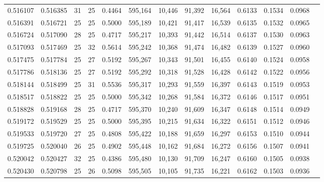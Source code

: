 \begin{tabular}{rrrrrrrrrrrrr}
0.516107 & 0.516385 &    31 &  25 &                                     0.4464 & 595,164 &  10,446 &  91,392 &  16,564 & 0.6133 & 0.1534 & 0.0968 \\
0.516391 & 0.516721 &    25 &  25 &                                     0.5000 & 595,189 &  10,421 &  91,417 &  16,539 & 0.6135 & 0.1532 & 0.0965 \\
0.516724 & 0.517090 &    28 &  25 &                                     0.4717 & 595,217 &  10,393 &  91,442 &  16,514 & 0.6137 & 0.1530 & 0.0963 \\
0.517093 & 0.517469 &    25 &  32 &                                     0.5614 & 595,242 &  10,368 &  91,474 &  16,482 & 0.6139 & 0.1527 & 0.0960 \\
0.517475 & 0.517784 &    25 &  27 &                                     0.5192 & 595,267 &  10,343 &  91,501 &  16,455 & 0.6140 & 0.1524 & 0.0958 \\
0.517786 & 0.518136 &    25 &  27 &                                     0.5192 & 595,292 &  10,318 &  91,528 &  16,428 & 0.6142 & 0.1522 & 0.0956 \\
0.518144 & 0.518499 &    25 &  31 &                                     0.5536 & 595,317 &  10,293 &  91,559 &  16,397 & 0.6143 & 0.1519 & 0.0953 \\
0.518517 & 0.518822 &    25 &  25 &                                     0.5000 & 595,342 &  10,268 &  91,584 &  16,372 & 0.6146 & 0.1517 & 0.0951 \\
0.518828 & 0.519168 &    28 &  25 &                                     0.4717 & 595,370 &  10,240 &  91,609 &  16,347 & 0.6148 & 0.1514 & 0.0949 \\
0.519172 & 0.519529 &    25 &  25 &                                     0.5000 & 595,395 &  10,215 &  91,634 &  16,322 & 0.6151 & 0.1512 & 0.0946 \\
0.519533 & 0.519720 &    27 &  25 &                                     0.4808 & 595,422 &  10,188 &  91,659 &  16,297 & 0.6153 & 0.1510 & 0.0944 \\
0.519725 & 0.520040 &    26 &  25 &                                     0.4902 & 595,448 &  10,162 &  91,684 &  16,272 & 0.6156 & 0.1507 & 0.0941 \\
0.520042 & 0.520427 &    32 &  25 &                                     0.4386 & 595,480 &  10,130 &  91,709 &  16,247 & 0.6160 & 0.1505 & 0.0938 \\
0.520430 & 0.520798 &    25 &  26 &                                     0.5098 & 595,505 &  10,105 &  91,735 &  16,221 & 0.6162 & 0.1503 & 0.0936 \\

\end{tabular}
